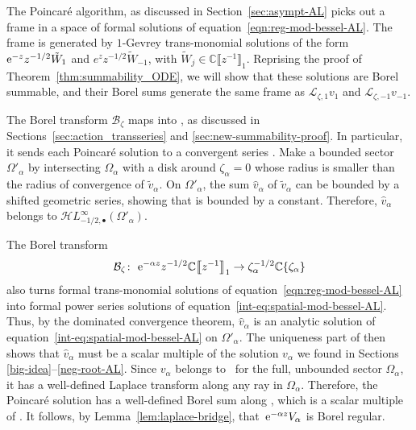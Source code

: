 \documentclass[10pt,a4paper]{amsart}
\newcommand{\singexp}[2]{\mathcal{H}L^\infty_{#1, #2}}
\newcommand{\singexpalg}[1]{\singexp{#1}{\bullet}}
\newcommand{\maps}{\colon}
\newcommand{\C}{\mathbb{C}}
\newcommand{\series}[1]{\tilde{#1}}
\newcommand{\laplace}{\mathcal{L}}
\newcommand{\borel}{\mathcal{B}}
\numberwithin{equation}{section}
\begin{document}
The Poincar\'e algorithm, as discussed in Section~\ref{sec:asympt-AL} picks out a frame in a space of formal solutions of equation~\eqref{eqn:reg-mod-bessel-AL}. The frame is generated by $1$-Gevrey trans-monomial solutions of the form ${\rm e}^{-z} z^{-1/2} \tilde{W}_1$ and $e^z z^{-1/2} \tilde{W}_{-1}$, with $\tilde{W}_j \in \C\big\llbracket z^{-1} \big\rrbracket_1$. Reprising the proof of Theorem~\ref{thm:summability_ODE}, we will show that these solutions are Borel summable, and their Borel sums generate the same frame as $\laplace_{\zeta, 1} v_1$ and $\laplace_{\zeta, -1} v_{-1}$.

The Borel transform $\borel_\zeta$ maps \smash{${\rm e}^{-\alpha z} z^{-1/2} \C\big\llbracket z^{-1} \big\rrbracket_1$} into \smash{$\zeta_\alpha^{-1/2} \C\{\zeta_\alpha\}$}, as discussed in Sections~\ref{sec:action_transseries} and \ref{sec:new-summability-proof}. In particular, it sends each Poincar\'e solution \smash{${\rm e}^{-\alpha z} z^{-1/2} \series{W}_\alpha$} to a convergent series \smash{$\series{v}_\alpha \in \zeta_\alpha^{-1/2} \C\{\zeta_\alpha\}$}. Make a bounded sector $\Omega'_\alpha$ by intersecting $\Omega_\alpha$ with a disk around $\zeta_\alpha = 0$ whose radius is smaller than the radius of convergence of $\series{v}_\alpha$. On $\Omega'_\alpha$, the sum $\hat{v}_\alpha$ of $\series{v}_\alpha$ can be bounded by a shifted geometric series, showing that  is bounded by a constant. Therefore, $\hat{v}_\alpha$ belongs to $\singexpalg{-1/2}(\Omega'_\alpha)$.

The Borel transform
\[ \borel_\zeta \maps\ {\rm e}^{-\alpha z} z^{-1/2} \C\big\llbracket z^{-1} \big\rrbracket_1 \to \zeta_\alpha^{-1/2} \C\{\zeta_\alpha\} \]
also turns formal trans-monomial solutions of equation~\eqref{eqn:reg-mod-bessel-AL} into formal power series solutions of equation~\eqref{int-eq:spatial-mod-bessel-AL}. Thus, by the dominated convergence theorem, $\hat{v}_\alpha$ is an analytic solution of equation~\eqref{int-eq:spatial-mod-bessel-AL} on $\Omega'_\alpha$. The uniqueness part of \cite[Theorem~4.6]{reg-sing-volterra} then shows that $\hat{v}_\alpha$ must be a scalar multiple of the solution $v_\alpha$ we found in Sections \ref{big-idea}--\ref{neg-root-AL}. Since $v_\alpha$ belongs to~\smash{$\singexpalg{-1/2}(\Omega_\alpha)$} for the full, unbounded sector $\Omega_\alpha$, it has a well-defined Laplace transform along any ray  in $\Omega_\alpha$. Therefore, the Poincar\'e solution \smash{${\rm e}^{-\alpha z} z^{-1/2} \series{W}_\alpha$} has a well-defined Borel sum along , which is a scalar multiple of . It follows, by Lemma~\ref{lem:laplace-bridge}, that~${\rm e}^{-\alpha z} V_\alpha$ is Borel regular.
%
\end{document}
